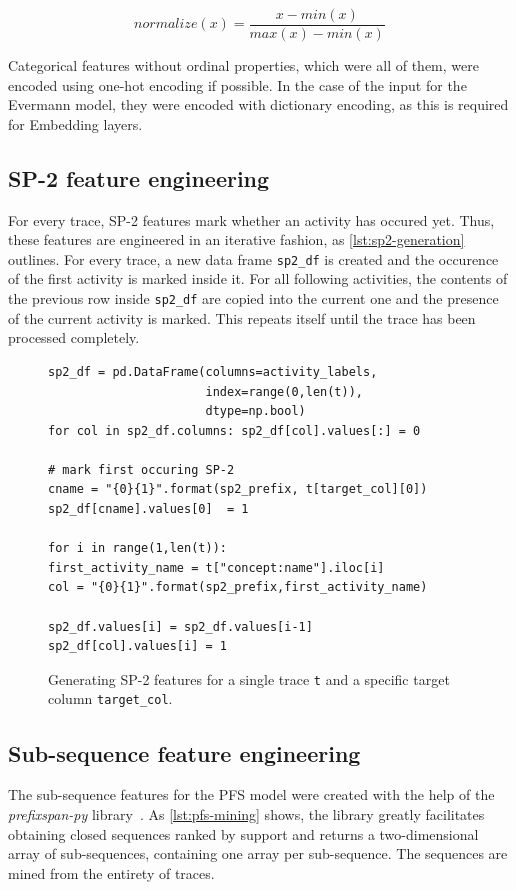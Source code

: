 $$normalize(x) = \frac{x-min(x)}{max(x)-min(x)}$$

Categorical features without ordinal properties, which were all of them, were encoded using one-hot encoding if possible. In the case of the input for the Evermann model, they were encoded with dictionary encoding, as this is required for Embedding layers.

\subsection*{SP-2 feature engineering}
For every trace, SP-2 features mark whether an activity has occured yet. Thus, these features are engineered in an iterative fashion, as \autoref{lst:sp2-generation} outlines. For every trace, a new data frame \texttt{sp2\_df} is created and the occurence of the first activity is marked inside it. For all following activities, the contents of the previous row inside \texttt{sp2\_df} are copied into the current one and the presence of the current activity is marked. This repeats itself until the trace has been processed completely.

\begin{figure}
\begin{verbatim}
sp2_df = pd.DataFrame(columns=activity_labels,
                      index=range(0,len(t)),
                      dtype=np.bool)
for col in sp2_df.columns: sp2_df[col].values[:] = 0

# mark first occuring SP-2 
cname = "{0}{1}".format(sp2_prefix, t[target_col][0])
sp2_df[cname].values[0]  = 1

for i in range(1,len(t)):
first_activity_name = t["concept:name"].iloc[i]
col = "{0}{1}".format(sp2_prefix,first_activity_name)

sp2_df.values[i] = sp2_df.values[i-1]
sp2_df[col].values[i] = 1
\end{verbatim}
\caption{Generating SP-2 features for a single trace \texttt{t} and a specific target column \texttt{target\_col}.}
\label{lst:sp2-generation}
\end{figure}

\subsection*{Sub-sequence feature engineering}
The sub-sequence features for the PFS model were created with the help of the \textit{prefixspan-py} library~\cite{web:prefixspan-py}. As \autoref{lst:pfs-mining} shows, the library greatly facilitates obtaining closed sequences ranked by support and returns a two-dimensional array of sub-sequences, containing one array per sub-sequence. The sequences are mined from the entirety of traces.

